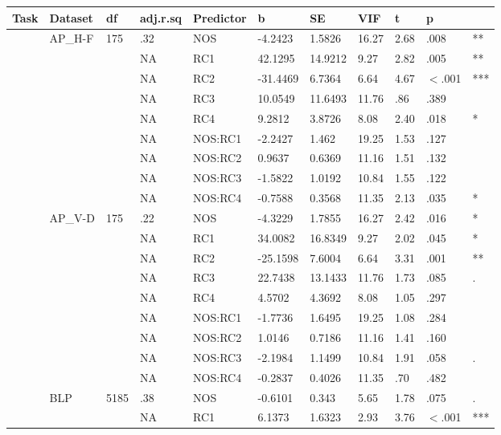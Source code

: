 \begin{table}[ht]
\centering
\begingroup\normalsize
\begin{tabular}{lllllllllll}
  \hline
Task & Dataset & df & adj.r.sq & Predictor & b & SE & VIF & t & p &  \\ 
  \hline
 & AP\_H-F & 175 & .32 & NOS & -4.2423 & 1.5826 & 16.27 & 2.68 & .008 & ** \\ 
   &  &  & NA & RC1 & 42.1295 & 14.9212 & 9.27 & 2.82 & .005 & ** \\ 
   &  &  & NA & RC2 & -31.4469 & 6.7364 & 6.64 & 4.67 & $<$.001 & *** \\ 
   &  &  & NA & RC3 & 10.0549 & 11.6493 & 11.76 & .86 & .389 &   \\ 
   &  &  & NA & RC4 & 9.2812 & 3.8726 & 8.08 & 2.40 & .018 & * \\ 
   &  &  & NA & NOS:RC1 & -2.2427 & 1.462 & 19.25 & 1.53 & .127 &   \\ 
   &  &  & NA & NOS:RC2 & 0.9637 & 0.6369 & 11.16 & 1.51 & .132 &   \\ 
   &  &  & NA & NOS:RC3 & -1.5822 & 1.0192 & 10.84 & 1.55 & .122 &   \\ 
   &  &  & NA & NOS:RC4 & -0.7588 & 0.3568 & 11.35 & 2.13 & .035 & * \\ 
   & AP\_V-D & 175 & .22 & NOS & -4.3229 & 1.7855 & 16.27 & 2.42 & .016 & * \\ 
   &  &  & NA & RC1 & 34.0082 & 16.8349 & 9.27 & 2.02 & .045 & * \\ 
   &  &  & NA & RC2 & -25.1598 & 7.6004 & 6.64 & 3.31 & .001 & ** \\ 
   &  &  & NA & RC3 & 22.7438 & 13.1433 & 11.76 & 1.73 & .085 & . \\ 
   &  &  & NA & RC4 & 4.5702 & 4.3692 & 8.08 & 1.05 & .297 &   \\ 
   &  &  & NA & NOS:RC1 & -1.7736 & 1.6495 & 19.25 & 1.08 & .284 &   \\ 
   &  &  & NA & NOS:RC2 & 1.0146 & 0.7186 & 11.16 & 1.41 & .160 &   \\ 
   &  &  & NA & NOS:RC3 & -2.1984 & 1.1499 & 10.84 & 1.91 & .058 & . \\ 
   &  &  & NA & NOS:RC4 & -0.2837 & 0.4026 & 11.35 & .70 & .482 &   \\ 
   & BLP & 5185 & .38 & NOS & -0.6101 & 0.343 & 5.65 & 1.78 & .075 & . \\ 
   &  &  & NA & RC1 & 6.1373 & 1.6323 & 2.93 & 3.76 & $<$.001 & *** \\ 

\end{tabular}
\end{table}
